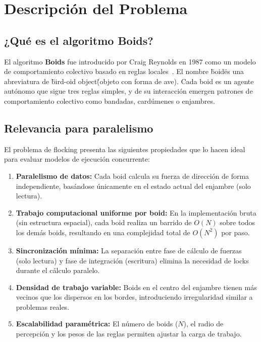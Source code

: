 \documentclass[11pt,a4paper]{article}
\begin{document}
\section{Descripción del Problema}
\label{sec:problema}

\subsection{¿Qué es el algoritmo Boids?}

El algoritmo \textbf{Boids} fue introducido por Craig Reynolds en 1987 como un modelo de comportamiento colectivo basado en reglas locales~\cite{reynolds1987}. El nombre \"boid\" es una abreviatura de \"bird-oid object\" (objeto con forma de ave). Cada boid es un agente autónomo que sigue tres reglas simples, y de su interacción emergen patrones de comportamiento colectivo como bandadas, cardúmenes o enjambres.

\subsection{Relevancia para paralelismo}

El problema de flocking presenta las siguientes propiedades que lo hacen ideal para evaluar modelos de ejecución concurrente:

\begin{enumerate}
  \item \textbf{Paralelismo de datos:} Cada boid calcula su fuerza de dirección de forma independiente, basándose únicamente en el estado actual del enjambre (solo lectura).
  \item \textbf{Trabajo computacional uniforme por boid:} En la implementación bruta (sin estructura espacial), cada boid realiza un barrido de $O(N)$ sobre todos los demás boids, resultando en una complejidad total de $O(N^2)$ por paso.
  \item \textbf{Sincronización mínima:} La separación entre fase de cálculo de fuerzas (solo lectura) y fase de integración (escritura) elimina la necesidad de locks durante el cálculo paralelo.
  \item \textbf{Densidad de trabajo variable:} Boids en el centro del enjambre tienen más vecinos que los dispersos en los bordes, introduciendo irregularidad similar a problemas reales.
  \item \textbf{Escalabilidad paramétrica:} El número de boids ($N$), el radio de percepción y los pesos de las reglas permiten ajustar la carga de trabajo.
\end{enumerate}
\end{document}
